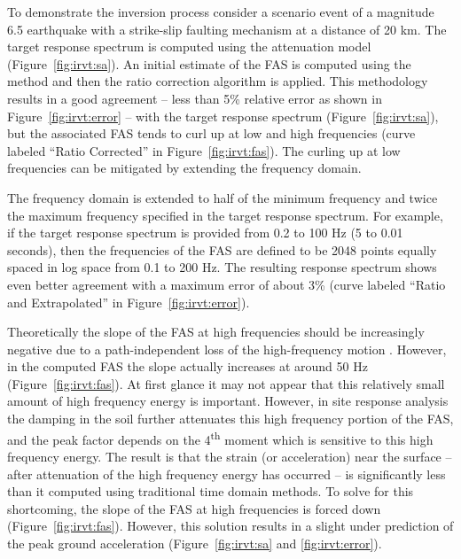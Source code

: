 \documentclass[12pt,oneside]{book}
\begin{document}
To demonstrate the inversion process consider a scenario event of a magnitude 6.5 earthquake with a
strike-slip faulting mechanism at a distance of 20 km.  The target response spectrum is computed
using the \citet{abrahamson:97} attenuation model (Figure~\ref{fig:irvt:sa}).  An initial estimate
of the FAS is computed using the \citet{gasparini:76} method and then the ratio correction algorithm
is applied.  This methodology results in a good agreement -- less than 5\% relative error as shown
in Figure~\ref{fig:irvt:error} -- with the target response spectrum (Figure~\ref{fig:irvt:sa}), but
the associated FAS tends to curl up at low and high frequencies (curve labeled ``Ratio Corrected''
in Figure~\ref{fig:irvt:fas}).  The curling up at low frequencies can be mitigated by extending the
frequency domain.  

The frequency domain is extended to half of the minimum frequency and twice the maximum
frequency specified in the target response spectrum.  For example, if the target response spectrum is provided from 0.2 to 100 Hz (5
to 0.01 seconds), then the frequencies of the FAS are defined to be 2048 points equally spaced in log
space from  0.1 to 200 Hz.  The resulting response spectrum shows even better agreement with a
maximum error of about 3\% (curve labeled ``Ratio and Extrapolated'' in Figure~\ref{fig:irvt:error}).  

Theoretically the slope of the FAS at high frequencies should be increasingly negative due to a
path-independent loss of the high-frequency motion \citep{boore:03}.  However, in the computed
FAS the slope actually increases at around 50 Hz (Figure~\ref{fig:irvt:fas}).  At first glance it
may not appear that this relatively small amount of high frequency energy is important.  However, in
site response analysis the damping in the soil further attenuates this high frequency portion of the
FAS, and the peak factor depends on the 4\textsuperscript{th} moment which is sensitive to this high
frequency energy.  The result is that the strain (or acceleration) near the surface -- after
attenuation of the high frequency energy has occurred -- is significantly less than it computed
using traditional time domain methods.  To solve for this shortcoming, the slope of the FAS at high
frequencies is forced down (Figure~\ref{fig:irvt:fas}).  However, this solution results in a slight under
prediction of the peak ground acceleration (Figure~\ref{fig:irvt:sa} and \ref{fig:irvt:error}).
\end{document}
